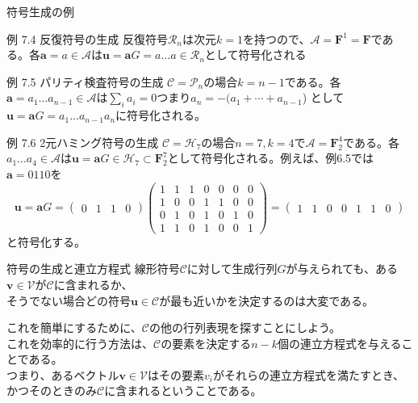 \documentclass[dvipdfmx,10pt,jsarticle]{beamer}
\begin{document}
  \begin{frame}{符号生成の例}
    \begin{block}{例 7.4 反復符号の生成}
      反復符号$\mathcal{R}_n$は次元$k = 1$を持つので、$\mathcal{A} = \mathbf{F}^1 = \mathbf{F}$である。各$\mathbf{a} = a \in \mathcal{A}$は$\mathbf{u} = \mathbf{a} G = a \ldots a \in \mathcal{R}_n$として符号化される
    \end{block}
    \begin{block}{例 7.5 パリティ検査符号の生成}
      $\mathcal{C} = \mathcal{P}_n$の場合$k = n - 1$である。各$\mathbf{a} = a_1 \ldots a_{n-1} \in \mathcal{A}$は$\sum_i a_i = 0$つまり$a_n = - ( a_1 + \cdots + a_{n-1}$) として$\mathbf{u} = \mathbf{a} G = a_1 \ldots a_{n-1} a_n$に符号化される。
    \end{block}
    \begin{block}{例 7.6 2元ハミング符号の生成}
      $\mathcal{C} = \mathcal{H}_7$の場合$n = 7, k = 4$で$\mathcal{A} = \mathbf{F}_2^4$である。各$a_1 \ldots a_4 \in \mathcal{A}$は$\mathbf{u} = \mathbf{a} G \in \mathcal{H}_7 \subset \mathbf{F}_2^7$として符号化される。例えば、例6.5では$\mathbf{a} = 0110$を
      {\scriptsize
      \[\mathbf{u} = \mathbf{a} G = \begin{pmatrix} 0 & 1 & 1 & 0 \end{pmatrix}\begin{pmatrix}
          1 & 1 & 1 & 0 & 0 & 0 & 0 \\
          1 & 0 & 0 & 1 & 1 & 0 & 0 \\
          0 & 1 & 0 & 1 & 0 & 1 & 0 \\
          1 & 1 & 0 & 1 & 0 & 0 & 1
      \end{pmatrix}  = \begin{pmatrix} 1 & 1 & 0 & 0 & 1 & 1 & 0 \end{pmatrix}\] 
      } と符号化する。
    \end{block}
  \end{frame}

  \begin{frame}{符号の生成と連立方程式}
    線形符号$\mathcal{C}$に対して生成行列$G$が与えられても、ある$\mathbf{v} \in \mathcal{V}$が$\mathcal{C}$に含まれるか、\\
    そうでない場合どの符号$\mathbf{u} \in \mathcal{C}$が最も近いかを決定するのは大変である。
    
    これを簡単にするために、$\mathcal{C}$の他の行列表現を探すことにしよう。\\
    これを効率的に行う方法は、$\mathcal{C}$の要素を決定する$n-k$個の連立方程式を与えることである。\\
    つまり、あるベクトル$\mathbf{v} \in \mathcal{V}$はその要素$v_i$がそれらの連立方程式を満たすとき、かつそのときのみ$\mathcal{C}$に含まれるということである。
  \end{frame}
\end{document}
